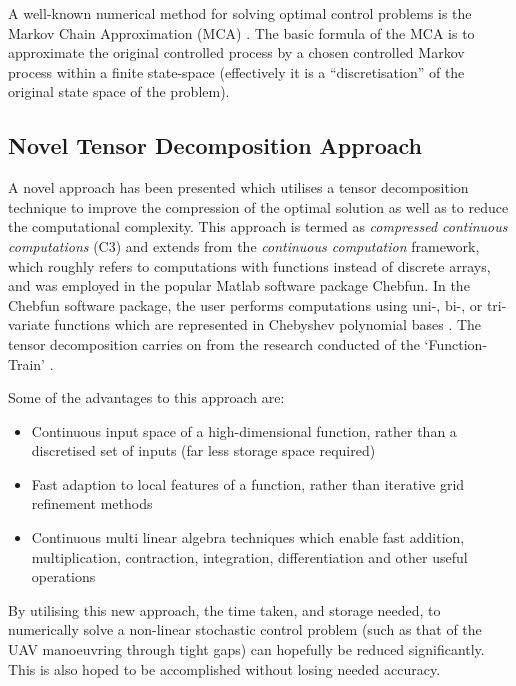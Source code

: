 \documentclass[11pt,draftd]{article}
\begin{document}
A well-known numerical method for solving optimal control problems is the Markov Chain Approximation (MCA) \cite{kushner}. The basic formula of the MCA is to approximate the original controlled process by a chosen controlled Markov process within a finite state-space (effectively it is a “discretisation” of the original state space of the problem). \\

\subsection{Novel Tensor Decomposition Approach}
A novel approach has been presented which utilises a tensor decomposition technique to improve the compression of the optimal solution as well as to reduce the computational complexity. This approach is termed as \textit{compressed continuous computations} (C3) and extends from the \textit{continuous computation} framework, which roughly refers to computations with functions instead of discrete arrays, and was employed in the popular Matlab software package Chebfun. In the Chebfun software package, the user performs computations using uni-, bi-, or tri-variate functions which are represented in Chebyshev polynomial bases \cite{chebfun}. The tensor decomposition carries on from the research conducted of the ‘Function-Train’ \cite{ft-alex}.

Some of the advantages to this approach are:
\begin{itemize}
	\item Continuous input space of a high-dimensional function, rather than a discretised set of inputs (far less storage space required)
	\item Fast adaption to local features of a function, rather than iterative grid refinement methods
	\item Continuous multi linear algebra techniques which enable fast addition, multiplication, contraction, integration, differentiation and other useful operations
\end{itemize}
By utilising this new approach, the time taken, and storage needed, to numerically solve a non-linear stochastic control problem (such as that of the UAV manoeuvring through tight gaps) can hopefully be reduced significantly. This is also hoped to be accomplished without losing needed accuracy.\\
\end{document}
